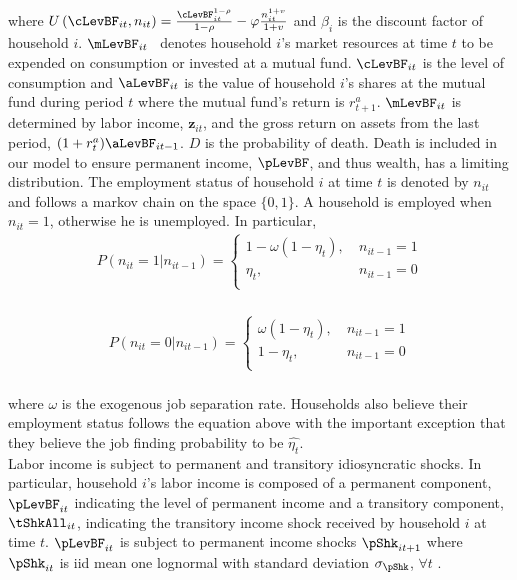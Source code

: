 \documentclass[titlepage]{\econtex}\providecommand{\texname}{Dissertation-Proposal}
\begin{document}
where
$U\left(\cLevBF_{i t}, n_{i t}\right) = \frac{\cLevBF_{i t}^{1-\rho}}{1 -\rho} - \varphi \frac{n_{it}^{1+v}}{1+v}$  and $\beta_{i}$ is the discount factor of household $i$. $\mLevBF_{it}$ \ denotes household $i$'s market resources at time $t$ to be expended on consumption or invested at a mutual fund. $\cLevBF_{it}$ is the level of consumption and $ \aLevBF_{it}$ is the value of household $i$'s shares at the mutual fund during period $t$ where the mutual fund's return is $r_{t+1}^{a}$.  $\mLevBF_{it}$ is determined by labor income,  $\mathbf{z}_{it}$, and the gross return on assets from the last period, $(1+r_{t}^{a}) \aLevBF_{it-1} $. $D$ is the probability of death. Death is included in our model to ensure permanent income, $\pLevBF$, and thus wealth, has a limiting distribution. The employment status of household $i$ at time $t$ is denoted by $n_{it}$ and follows a markov chain on the space $\{0,1\}$.  A household is employed when $n_{it} = 1$, otherwise he is unemployed. In particular,\\

\begin{align*} 
P(n_{it} = 1 | n_{it-1}) = \begin{cases}
       1 - \omega(1-\eta_{t}),   & \ n_{it-1} = 1 \\
       \eta_{t},  &  \ n_{it-1} = 0 \\
    \end{cases}\\
\end{align*}


\begin{align*} 
P(n_{it} = 0 | n_{it-1}) = \begin{cases}
        \omega(1-\eta_{t}),   & \ n_{it-1} = 1 \\
       1- \eta_{t},  &  \ n_{it-1} = 0 \\
    \end{cases}\\
\end{align*}

where  $\omega$ is the exogenous job separation rate. Households also believe their employment status follows the equation above with the important exception that they believe the job finding probability to be $\hat{\eta_{t}}$.\\


Labor income is subject to permanent and transitory idiosyncratic shocks. In particular, household $i$'s labor income is composed of a permanent component, $\pLevBF_{it} $ indicating the level of permanent income and a transitory component, $\tShkAll_{it} $, indicating the transitory income shock received by household $i$ at time $t$. $\pLevBF_{it} $ is subject to permanent income shocks $\pShk_{it+1}$ where $\pShk_{it}$ is iid mean one lognormal with standard deviation $\sigma_\pShk$, $\forall t$ . \\
\end{document}
